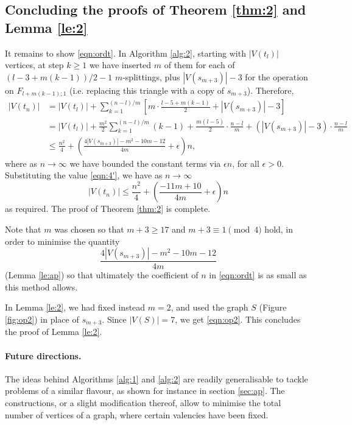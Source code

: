 \documentclass[11pt]{article}
\theoremstyle{definition}
\numberwithin{equation}{section}
\begin{document}
\subsection{Concluding the proofs of Theorem \ref{thm:2} and Lemma \ref{le:2}}
\label{sec:end}
It remains to show \eqref{eqn:ordt}. In Algorithm \ref{alg:2}, starting with $|V(t_l)|$ vertices, at step $k\geq 1$ we have inserted $m$ of them for each of $(l-3+m(k-1))/2-1$ $m$-splittings, plus $|V(s_{m+3})|-3$ for the operation on $F_{l+m(k-1);1}$ (i.e. replacing this triangle with a copy of $s_{m+3}$). Therefore,
\begin{align*}
|V(t_{n})|&=|V(t_l)|+\sum_{k=1}^{(n-l)/m}\left[m\cdot\frac{l-5+m(k-1)}{2}+|V(s_{m+3})|-3\right]
\\&=|V(t_l)|+\frac{m^2}{2}\sum_{k=1}^{(n-l)/m}(k-1)+\frac{m(l-5)}{2}\cdot\frac{n-l}{m}+(|V(s_{m+3})|-3)\cdot\frac{n-l}{m}
\\&\leq\frac{n^2}{4}+\left(\frac{4|V(s_{m+3})|-m^2-10m-12}{4m}+\epsilon\right)n,
\end{align*}
where as $n\to\infty$ we have bounded the constant terms via $\epsilon n$, for all $\epsilon>0$. Substituting the value \eqref{eqn:4'}, we have as $n\to\infty$
\[|V(t_{n})|\leq\frac{n^2}{4}+\left(\frac{-11m+10}{4m}+\epsilon\right)n\]
as required. The proof of Theorem \ref{thm:2} is complete.

Note that $m$ was chosen so that $m+3\geq 17$ and $m+3\equiv 1\pmod 4$ hold, in order to minimise the quantity
\[\frac{4|V(s_{m+3})|-m^2-10m-12}{4m}\]
(Lemma \ref{le:ap}) so that ultimately the coefficient of $n$ in \eqref{eqn:ordt} is as small as this method allows.

In Lemma \ref{le:2}, we had fixed instead $m=2$, and used the graph $S$ (Figure \ref{fig:op2}) in place of $s_{m+3}$. Since $|V(S)|=7$, we get \eqref{eqn:op2}. This concludes the proof of Lemma \ref{le:2}.


\paragraph{Future directions.}
The ideas behind Algorithms \ref{alg:1} and \ref{alg:2} are readily generalisable to tackle problems of a similar flavour, as shown for instance in section \ref{sec:ap}. The constructions, or a slight modification thereof, allow to minimise the total number of vertices of a graph, where certain valencies have been fixed.


\appendix
\end{document}
